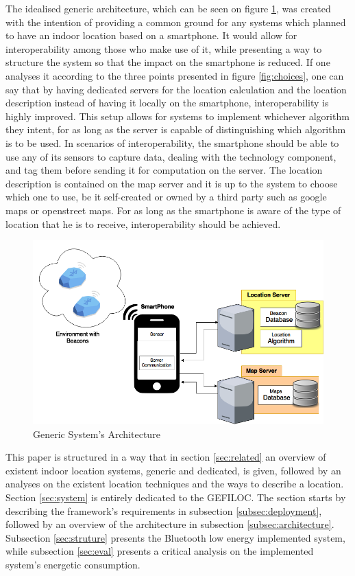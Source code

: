 \documentclass[a4paper]{IEEEtran}
\begin{document}
 
The idealised generic architecture, which can be seen on figure \ref{fig:generic}, was created with the intention of providing a common ground for any systems which planned to have an indoor location based on a smartphone. It would allow for interoperability among those who make use of it, while presenting a way to structure the system so that the impact on the smartphone is reduced. If one analyses it according to the three points presented in figure \ref{fig:choices}, one can say that by having dedicated servers for the location calculation and the location description instead of having it locally on the smartphone, interoperability is highly improved. This setup allows for systems to implement whichever algorithm they intent, for as long as the server is capable of distinguishing which algorithm is to be used. In scenarios of interoperability, the smartphone should be able to use any of its sensors to capture data, dealing with the technology component, and tag them before sending it for computation on the server. The location description is contained on the map server and it is up to the system to choose which one to use, be it self-created or owned by a third party such as google maps or openstreet maps. For as long as the smartphone is aware of the type of location that he is to receive, interoperability should be achieved. 
 
\begin{figure} 
\centering 
\includegraphics[width=1\linewidth]{figures/generic.png} 
\caption[Generic System's Architecture]{Generic System's Architecture} 
\label{fig:generic} 
\end{figure} 
 
This paper is structured in a way that in section \ref{sec:related} an overview of existent indoor location systems, generic and dedicated, is given, followed by an analyses on the existent location techniques and the ways to describe a location. Section \ref{sec:system} is entirely dedicated to the GEFILOC. The section starts by describing the framework's requirements in subsection \ref{subsec:deployment}, followed by an overview of the architecture in subsection \ref{subsec:architecture}. Subsection \ref{sec:struture} presents the Bluetooth low energy implemented system, while subsection \ref{sec:eval} presents a critical analysis on the implemented system's energetic consumption.  
 
\end{document}
